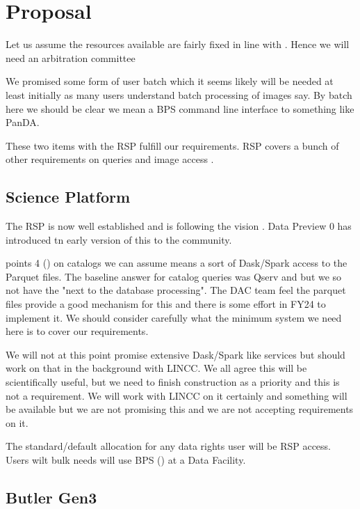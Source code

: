 \section{Proposal} \label{sec:proposal}

Let us assume the resources available are fairly fixed in line with .
Hence we will need an arbitration committee 

We promised some form of user batch which it seems likely will be needed at least initially as many users understand batch processing of images say. By batch here we should be clear we mean a BPS command line interface to something like PanDA. 

These two items with the RSP fulfill our requirements.  RSP covers a bunch of other requirements on queries and image access .


\subsection{Science Platform}\label{sec:rsp}
The RSP is now well established and is following the vision .
Data Preview 0 has introduced tn early version of this to the community.

 points 4 () on catalogs we can assume means a sort of Dask/Spark access to the Parquet files.  The baseline answer for catalog queries  was Qserv and but we so not have the "next to the database processing". The DAC team feel the parquet files provide a good mechanism for this and there is some effort in FY24 to implement it. We should consider carefully what the minimum system we need here is to cover our requirements.

We will not at this point promise extensive Dask/Spark like services but should work on that in the background with LINCC.
We all agree this will be scientifically useful, but we need to finish construction as a priority and this is not a requirement. We will work with LINCC on it certainly and something will be available but we are not promising this and we are not accepting requirements on it.

The standard/default allocation for any data rights user will be RSP access.
Users wilt bulk needs will use BPS () at a Data Facility.


\subsection{Butler Gen3} \label{sec:gen3}


